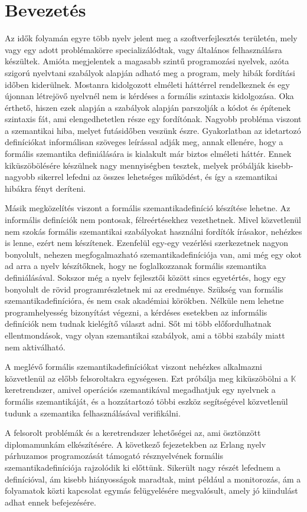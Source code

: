 \section{Bevezetés}
Az idők folyamán egyre több nyelv jelent meg a szoftverfejlesztés területén, mely vagy egy adott problémakörre specializálódtak, vagy általános felhasználásra készültek. Amióta megjelentek a magasabb szintű programozási nyelvek, azóta szigorú nyelvtani szabályok alapján adható meg a program, mely hibák fordítási időben kiderülnek. Mostanra kidolgozott elméleti háttérrel rendelkeznek és egy újonnan létrejövő nyelvnél nem is kérdéses a formális szintaxis kidolgozása. Oka érthető, hiszen ezek alapján a szabályok alapján parszolják a kódot és építenek szintaxis fát, ami elengedhetetlen része egy fordítónak. Nagyobb probléma viszont a szemantikai hiba, melyet futásidőben veszünk észre. Gyakorlatban az idetartozó definíciókat informálisan szöveges leírással adják meg, annak ellenére, hogy a formális szemantika definiálására is kialakult már biztos elméleti háttér. Ennek kiküszöbölésére készülnek nagy mennyiségben tesztek, melyek próbálják kisebb-nagyobb sikerrel lefedni az összes lehetséges működést, és így a szemantikai hibákra fényt deríteni.

Másik megközelítés viszont a formális szemantikadefiníció készítése lehetne. Az informális definíciók nem pontosak, félreértésekhez vezethetnek. Mivel közvetlenül nem szokás formális szemantikai szabályokat használni fordítók írásakor, nehézkes is lenne, ezért nem készítenek. Ezenfelül egy-egy vezérlési szerkezetnek nagyon bonyolult, nehezen megfogalmazható szemantikadefiníciója van, ami még egy okot ad arra a nyelv készítőknek, hogy ne foglalkozzanak formális szemantika definiálásával. Sokszor még a nyelv fejlesztői között sincs egyetértés, hogy egy bonyolult de rövid programrészletnek mi az eredménye. Szükség van formális szemantikadefinícióra, és nem csak akadémiai körökben. Nélküle nem lehetne programhelyesség bizonyítást végezni, a kérdéses esetekben az informális definíciók nem tudnak kielégítő választ adni. Sőt mi több előfordulhatnak ellentmondások, vagy olyan szemantikai szabályok, ami a többi szabály miatt nem aktiválható.

A meglévő formális szemantikadefiníciókat viszont nehézkes alkalmazni közvetlenül az előbb felsoroltakra egységesen. Ezt próbálja meg kiküszöbölni a $\mathbb{K}$ keretrendszer, amivel operációs szemantikával megadhatjuk egy nyelvnek a formális szemantikáját, és a hozzátartozó többi eszköz segítségével közvetlenül tudunk a szemantika felhasználásával verifikálni.

A felsorolt problémák és a keretrendszer lehetőségei az, ami ösztönzött diplomamunkám elkészítésére. A következő fejezetekben az Erlang nyelv párhuzamos programozását támogató résznyelvének formális szemantikadefiníciója rajzolódik ki előttünk. Sikerült nagy részét lefednem a definícióval, ám kisebb hiányosságok maradtak, mint például a monitorozás, ám a folyamatok közti kapcsolat egymás felügyelésére megvalósult, amely jó kiindulást adhat ennek befejezésére.